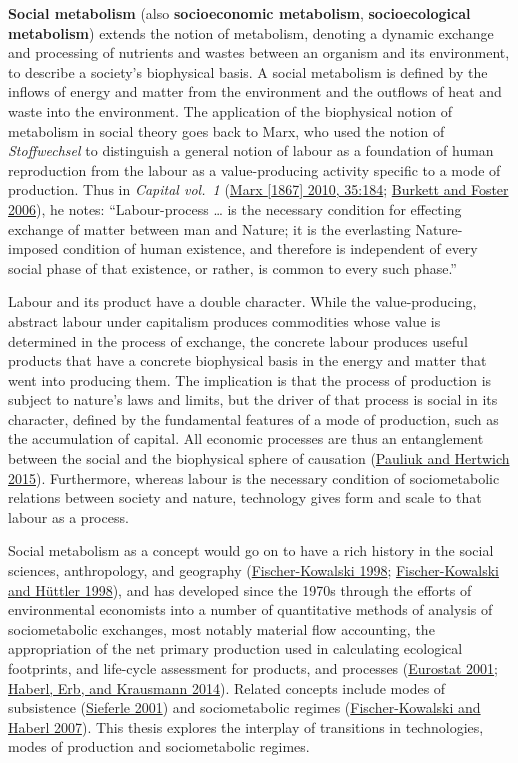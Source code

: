 \documentclass[a4paper, nobind]{templates/ociamthesis}
\begin{document}
\textbf{Social metabolism} (also \textbf{socioeconomic metabolism}, \textbf{socioecological metabolism}) extends the notion of metabolism, denoting a dynamic exchange and processing of nutrients and wastes between an organism and its environment, to describe a society's biophysical basis. A social metabolism is defined by the inflows of energy and matter from the environment and the outflows of heat and waste into the environment. The application of the biophysical notion of metabolism in social theory goes back to Marx, who used the notion of \emph{Stoffwechsel} to distinguish a general notion of labour as a foundation of human reproduction from the labour as a value-producing activity specific to a mode of production. Thus in \emph{Capital vol.~1} (\protect\hyperlink{ref-marx_capital_1867}{Marx {[}1867{]} 2010, 35:184}; \protect\hyperlink{ref-burkett_metabolism_2006}{Burkett and Foster 2006}), he notes: ``Labour-process \ldots{} is the necessary condition for effecting exchange of matter between man and Nature; it is the everlasting Nature-imposed condition of human existence, and therefore is independent of every social phase of that existence, or rather, is common to every such phase.''

Labour and its product have a double character. While the value-producing, abstract labour under capitalism produces commodities whose value is determined in the process of exchange, the concrete labour produces useful products that have a concrete biophysical basis in the energy and matter that went into producing them. The implication is that the process of production is subject to nature's laws and limits, but the driver of that process is social in its character, defined by the fundamental features of a mode of production, such as the accumulation of capital. All economic processes are thus an entanglement between the social and the biophysical sphere of causation (\protect\hyperlink{ref-pauliuk_socioeconomic_2015}{Pauliuk and Hertwich 2015}). Furthermore, whereas labour is the necessary condition of sociometabolic relations between society and nature, technology gives form and scale to that labour as a process.

Social metabolism as a concept would go on to have a rich history in the social sciences, anthropology, and geography (\protect\hyperlink{ref-fischer-kowalski_societys_1998c}{Fischer-Kowalski 1998}; \protect\hyperlink{ref-fischer-kowalski_societys_1998d}{Fischer-Kowalski and Hüttler 1998}), and has developed since the 1970s through the efforts of environmental economists into a number of quantitative methods of analysis of sociometabolic exchanges, most notably material flow accounting, the appropriation of the net primary production used in calculating ecological footprints, and life-cycle assessment for products, and processes (\protect\hyperlink{ref-eurostat_economy-wide_2001}{Eurostat 2001}; \protect\hyperlink{ref-haberl_human_2014}{Haberl, Erb, and Krausmann 2014}). Related concepts include modes of subsistence (\protect\hyperlink{ref-sieferle_subterranean_2001}{Sieferle 2001}) and sociometabolic regimes (\protect\hyperlink{ref-fischer-kowalski_socioecological_2007}{Fischer-Kowalski and Haberl 2007}). This thesis explores the interplay of transitions in technologies, modes of production and sociometabolic regimes.
\end{document}
